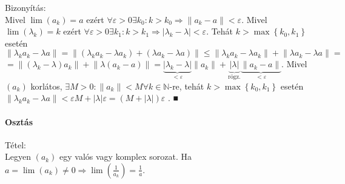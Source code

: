 \documentclass[]{scrartcl}
\let\oldparagraph\paragraph
\renewcommand{\paragraph}[1]{\oldparagraph{#1}\mbox{}}
\newenvironment{tetel}{}{}
\newenvironment{bizonyitas}{}{}
\begin{document}
\begin{bizonyitas}

Bizonyítás:\\
Mivel \(\lim\left( a_{k} \right) = a\) ezért
\(\left. \forall\varepsilon > 0\exists k_{0}:k > k_{0}\Rightarrow\left\| {a_{k} - a} \parallel \right. < \varepsilon \right.\).
Mivel \(\lim\left( \lambda_{k} \right) = k\) ezért
\(\left. \forall\varepsilon > 0\exists k_{1}:k > k_{1}\Rightarrow\left| {\lambda_{k} - \lambda} \right| < \varepsilon \right.\).
Tehát \(k > \max\left\{ {k_{0},k_{1}} \right\}\) esetén
\(\left\| {\lambda_{k}a_{k} - \lambda a} \parallel \right. = \left\| {\left( {\lambda_{k}a_{k} - \lambda a_{k}} \right) + \left( {\lambda a_{k} - \lambda a} \right)} \parallel \right. \leq \left\| {\lambda_{k}a_{k} - \lambda a_{k}} \parallel \right. + \left\| {\lambda a_{k} - \lambda a} \parallel \right. =\)
\(= \left\| {\left( {\lambda_{k} - \lambda} \right)a_{k}} \parallel \right. + \left\| {\lambda\left( {a_{k} - a} \right)} \parallel \right. = \underset{< \varepsilon}{\underbrace{\left| {\lambda_{k} - \lambda} \right|}}\left\| a_{k} \parallel \right. + \underset{\text{rögz.}}{\underbrace{\left| \lambda \right|}}\underset{< \varepsilon}{\underbrace{\left\| {a_{k} - a} \parallel \right.}}\).
Mivel \(\left( a_{k} \right)\) korlátos,
\(\exists M > 0:\left\| a_{k} \parallel \right. < M\forall k \in {\mathbb{N}}\)-re,
tehát \(k > \max\left\{ {k_{0},k_{1}} \right\}\) esetén
\(\left\| {\lambda_{k}a_{k} - \lambda a} \parallel \right. < \varepsilon M + \left| \lambda \right|\varepsilon = \left( {M + \left| \lambda \right|} \right)\varepsilon\)
. ■

\end{bizonyitas}

\paragraph{Osztás}\label{osztas}

\begin{tetel}

Tétel:\\
Legyen \(\left( a_{k} \right)\) egy valós vagy komplex sorozat. Ha
\(\left. a = \lim\left( a_{k} \right) \neq 0\Rightarrow\lim\left( \frac{1}{a_{k}} \right) = \frac{1}{a} \right.\).

\end{tetel}
\end{document}
